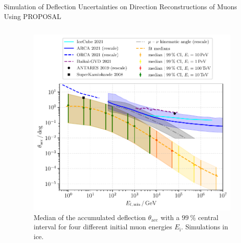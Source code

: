 \documentclass[t]{beamer}
\begin{document}
\begin{columns}[onlytextwidth]
\begin{column}{\textwidth}
\begin{block}[equal height group=J]{Simulation of Deflection Uncertainties on Direction Reconstructions of Muons Using PROPOSAL}
\begin{columns}[onlytextwidth]
\begin{column}{0.33\textwidth}
           \end{column}
          \begin{column}{0.33\textwidth}
            \begin{figure}
              \includegraphics[width=0.9\linewidth, height=.4\textheight, keepaspectratio]{plots/fit_median_defl_cut_10percent_only_poly_new_resolution_rescale_no_icecube_paper_final_all.pdf}
              \caption*{Median of the accumulated deflection $\theta_\text{acc}$ with a $\SI{99}{\percent}$ central interval for four different initial muon energies $E_\text{i}$. Simulations in ice.}
            \end{figure}
          \end{column}
      \end{columns}



    \end{block}
    \end{column}%
  \end{columns}%
\end{document}

